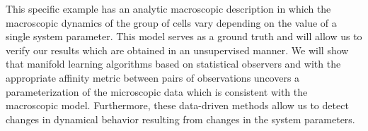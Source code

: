 \documentclass[preprint]{elsarticle}
\begin{document}
%
%
%
%
%
This specific example has an analytic macroscopic description in which the macroscopic dynamics of the group of cells vary depending on the value of a single system parameter.
%
This model serves as a ground truth and will allow us to verify our results which are obtained in an unsupervised manner.
%
We will show that manifold learning algorithms based on statistical observers and with the appropriate affinity metric between pairs of observations uncovers a parameterization of the microscopic data which is consistent with the macroscopic model.
%
Furthermore, these data-driven methods allow us to detect changes in dynamical behavior resulting from changes in the system parameters. 

%
\end{document}
